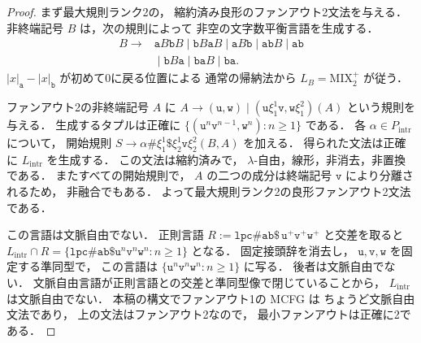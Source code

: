 \begin{proof}
まず最大規則ランク2の，
縮約済み良形のファンアウト2文法を与える．
非終端記号 $B$ は，次の規則によって
非空の文字数平衡言語を生成する．
\[
\begin{aligned}
 B\to{}&
 \mathtt a B\mathtt b B
 \mid \mathtt b B\mathtt a B
 \mid \mathtt a B\mathtt b
 \mid \mathtt a\mathtt b B
 \mid \mathtt a\mathtt b\\
 &{}\mid
 \mathtt b B\mathtt a
 \mid \mathtt b\mathtt a B
 \mid \mathtt b\mathtt a .
\end{aligned}
\]
$|x|_{\mathtt a}-|x|_{\mathtt b}$ が初めて0に戻る位置による
通常の帰納法から
$L_B=\mathrm{MIX}_2^+$ が従う．

ファンアウト2の非終端記号 $A$ に
\(A\to(\mathtt u,\mathtt w) \mid (\mathtt u\xi_1^1\mathtt v,\mathtt w\xi_1^2)(A)\)
という規則を与える．
生成するタプルは正確に
\(\{(\mathtt u^n\mathtt v^{n-1},\mathtt w^n):n\ge1\}\)
である．
各 $\alpha\in P_{\mathrm{intr}}$ について，
開始規則
\(S\to \alpha\mathtt{\#}\xi_1^1\mathtt{\$} \xi_2^1\mathtt v\xi_2^2(B,A)\)
を加える．
得られた文法は正確に $L_{\mathrm{intr}}$ を生成する．
この文法は縮約済みで，
$\lambda$-自由，線形，非消去，非置換である．
またすべての開始規則で，
$A$ の二つの成分は終端記号 $\mathtt v$ により分離されるため，
非融合でもある．
よって最大規則ランク2の良形ファンアウト2文法である．

この言語は文脈自由でない．
正則言語
\(R:= \mathtt{lpc\#ab\$}\, \mathtt u^+\mathtt v^+\mathtt w^+\)
と交差を取ると
\(L_{\mathrm{intr}}\cap R = \{\mathtt{lpc\#ab\$}\mathtt u^n \mathtt v^n\mathtt w^n:n\ge1\}\)
となる．
固定接頭辞を消去し，
$\mathtt u,\mathtt v,\mathtt w$ を固定する準同型で，
この言語は
$\{\mathtt u^n\mathtt v^n\mathtt w^n:n\ge1\}$
に写る．
後者は文脈自由でない．
文脈自由言語が正則言語との交差と準同型像で閉じていることから，
$L_{\mathrm{intr}}$ は文脈自由でない．
本稿の構文でファンアウト1の MCFG は
ちょうど文脈自由文法であり，
上の文法はファンアウト2なので，
最小ファンアウトは正確に2である．


\end{proof}
